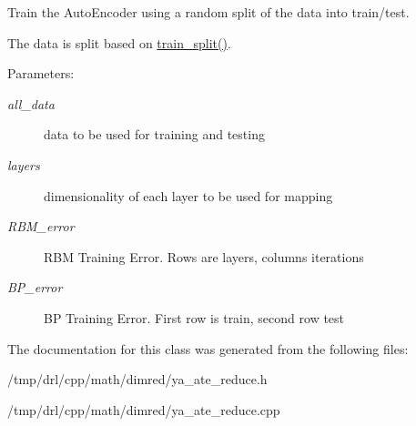 Train the Auto\-Encoder using a random split of the data into train/test. 

The data is split based on \hyperlink{class_y_a_a_t_e_reduce_a16}{train\_\-split()}. \begin{Desc}
\item[Parameters:]
\begin{description}
\item[{\em all\_\-data}]data to be used for training and testing \item[{\em layers}]dimensionality of each layer to be used for mapping \item[{\em RBM\_\-error}]RBM Training Error. Rows are layers, columns iterations \item[{\em BP\_\-error}]BP Training Error. First row is train, second row test \end{description}
\end{Desc}


The documentation for this class was generated from the following files:\begin{CompactItemize}
\item 
/tmp/drl/cpp/math/dimred/ya\_\-ate\_\-reduce.h\item 
/tmp/drl/cpp/math/dimred/ya\_\-ate\_\-reduce.cpp\end{CompactItemize}
